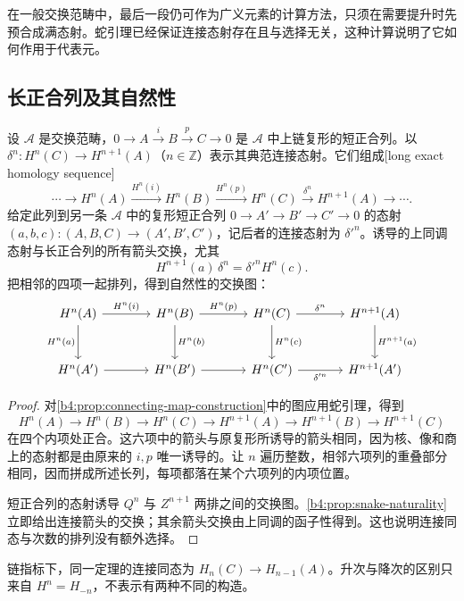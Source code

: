 在一般交换范畴中，最后一段仍可作为广义元素的计算方法，只须在需要提升时先预合成满态射。蛇引理已经保证连接态射存在且与选择无关，这种计算说明了它如何作用于代表元。

\subsection{长正合列及其自然性}
\label{b4:subsec:0503:02}

\begin{theorem}[同调长正合列]\label{b4:thm:cohomology-long-exact}
设 \(\mathcal A\) 是交换范畴，\(0\to A\xrightarrow{i}B\xrightarrow{p}C\to0\) 是 \(\mathcal A\) 中上链复形的短正合列。以 \(\delta^n:H^n(C)\to H^{n+1}(A)\)（\(n\in\mathbb Z\)）表示其典范连接态射。它们组成[long exact homology sequence]
\[
\cdots\longrightarrow H^n(A)\xrightarrow{H^n(i)}H^n(B)
\xrightarrow{H^n(p)}H^n(C)\xrightarrow{\delta^n}H^{n+1}(A)
\longrightarrow\cdots.
\]
给定此列到另一条 \(\mathcal A\) 中的复形短正合列 \(0\to A'\to B'\to C'\to0\) 的态射 \((a,b,c):(A,B,C)\to(A',B',C')\)，记后者的连接态射为 \(\delta'^n\)。诱导的上同调态射与长正合列的所有箭头交换，尤其
\[
H^{n+1}(a)\,\delta^n=\delta'^n H^n(c).
\]
把相邻的四项一起排列，得到自然性的交换图：
\[
\begin{tikzcd}[column sep=large,row sep=large]
H^n(A)\arrow[r,"H^n(i)"]\arrow[d,"H^n(a)"']&H^n(B)\arrow[r,"H^n(p)"]\arrow[d,"H^n(b)"]&H^n(C)\arrow[r,"\delta^n"]\arrow[d,"H^n(c)"]&H^{n+1}(A)\arrow[d,"H^{n+1}(a)"]\\
H^n(A')\arrow[r]&H^n(B')\arrow[r]&H^n(C')\arrow[r,"\delta'^n"']&H^{n+1}(A')
\end{tikzcd}
\]
\end{theorem}
\begin{proof}
对\cref{b4:prop:connecting-map-construction}中的图应用蛇引理，得到
\[
H^n(A)\to H^n(B)\to H^n(C)\to
H^{n+1}(A)\to H^{n+1}(B)\to H^{n+1}(C)
\]
在四个内项处正合。这六项中的箭头与原复形所诱导的箭头相同，因为核、像和商上的态射都是由原来的 \(i,p\) 唯一诱导的。让 \(n\) 遍历整数，相邻六项列的重叠部分相同，因而拼成所述长列，每项都落在某个六项列的内项位置。

短正合列的态射诱导 \(Q^n\) 与 \(Z^{n+1}\) 两排之间的交换图。\cref{b4:prop:snake-naturality}立即给出连接箭头的交换；其余箭头交换由上同调的函子性得到。这也说明连接同态与次数的排列没有额外选择。
\end{proof}

链指标下，同一定理的连接同态为 \(H_n(C)\to H_{n-1}(A)\)。升次与降次的区别只来自 \(H^n=H_{-n}\)，不表示有两种不同的构造。

